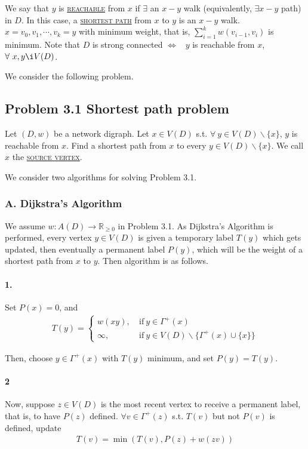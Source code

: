 We say that $y$ is \uline{\textcolor{MarkerColour}{\textsc{reachable}}} from $x$ if $\exists$ an $x-y$ walk (equivalently, $\exists x-y$ path) in $D$. In this case, a \uline{\textcolor{MarkerColour}{\textsc{shortest path}}} from $x$ to $y$ is an $x-y$ walk. $x = v_0,v_1,\cdots, v_k =y$ with minimum weight, that is, $\sum\limits_{i=1}^k w(v_{i-1}, v_i)$ is minimum. Note that $D$ is strong connected $\Longleftrightarrow$ \ $y$ is reachable from $x$, $\forall\ x, y\i V(D)$.

We consider the following problem.
\subsection{Problem 3.1 Shortest path problem}
Let $(D, w)$ be a network digraph. Let $x\in V(D)$ s.t. $\forall \ y\in V(D)\backslash \{x\}$, $y$ is reachable from $x$. Find a shortest path from $x$ to every $y\in V(D)\backslash \{x\}$. We call $x$ the \uline{\textcolor{MarkerColour}{\textsc{source vertex}}}.

We consider two algorithms for solving Problem 3.1.
\subsubsection{A. Dijkstra's Algorithm}
We assume $w: A(D)\to \mathbb{R}_{\geqslant 0}$ in Problem 3.1. As Dijkstra's Algorithm is performed, every vertex $y\in V(D)$ is given a temporary label $T(y)$ which gets updated, then eventually a permanent label $P(y)$, which will be the weight of a shortest path from $x$ to $y$. Then algorithm is as follows.

\paragraph{1.} Set $P(x) = 0$, and
\begin{align*}
    T(y) = \left\lbrace\begin{array}{ll}
        w(xy), &\ \text{if} \ y\in \Gamma^+(x)  \\
        \infty, &\ \text{if} \ y\in V(D)\backslash \{\Gamma^+(x)\cup\{x\}\}
    \end{array} \right.
\end{align*}

Then, choose $y\in\Gamma^+(x)$ with $T(y)$ minimum, and set $P(y) = T(y)$.

\paragraph{2} Now, suppose $z\in V(D)$ is the most recent vertex to receive a permanent label, that is, to have $P(z)$ defined. $\forall v\in \Gamma^+(z)$ s.t. $T(v)$ but not $P(v)$ is defined, update
\begin{align*}
    T(v) = \min\left( T(v), P(z) + w(zv)\right)
\end{align*}

